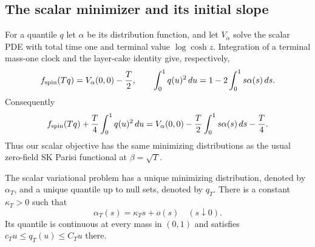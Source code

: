 \subsection{The scalar minimizer and its initial slope}

For a quantile $q$ let $\alpha$ be its distribution function, and
let $V_\alpha$ solve the scalar PDE with total time one and terminal
value $\log\cosh z$. Integration of a terminal mass-one clock and
the layer-cake identity give, respectively,
\[
 f_{\rm spin}(Tq)=V_\alpha(0,0)-\frac T2,
 \qquad
 \int_0^1q(u)^2\,du=1-2\int_0^1s\alpha(s)\,ds.
\]
Consequently
\[
 f_{\rm spin}(Tq)+\frac T4\int_0^1q(u)^2\,du
 =V_\alpha(0,0)-\frac T2\int_0^1s\alpha(s)\,ds-\frac T4.
\]
Thus our scalar objective has the same minimizing distributions as
the usual zero-field SK Parisi functional at $\beta=\sqrt T$.

\begin{lemma}
\label{prof:scalar-minimizer}
The scalar variational problem has a unique minimizing distribution,
denoted by $\alpha_T$, and a unique quantile up to null sets,
denoted by $q_T$. There is a constant $\kappa_T>0$ such that
\[
 \alpha_T(s)=\kappa_Ts+o(s)\quad(s\downarrow0).
\]
Its quantile is continuous at every mass in $(0,1)$ and satisfies
$c_Tu\le q_T(u)\le C_Tu$ there.
\end{lemma}

